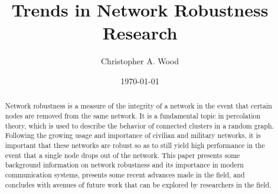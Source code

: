 \documentclass[10pt,a4paper,onecolumn]{article}
\author{Christopher A. Wood}
\title{Trends in Network Robustness Research}
\date{\today}
\begin{document}
\maketitle

\begin{abstract}
Network robustness is a measure of the integrity of a network in the event that
certain nodes are removed from the same network. It is a fundamental topic in
percolation theory, which is used to describe the behavior of connected clusters
in a random graph. Following the growing usage and importance of civilian and 
military networks, it is important that these networks are robust so as to still 
yield high performance in the event that a single node drops out of the network.
This paper presents some background information on network robustness and
its importance in modern communication systems, presents some recent advances
made in the field, and concludes with avenues of future work that can be explored
by researchers in the field. 
\end{abstract}

\end{document}
